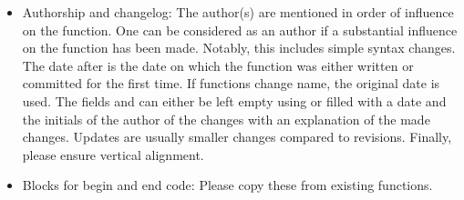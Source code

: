 \begin{itemize}
	\item Authorship and changelog:
	The author(s)  are mentioned in order of influence on the function.
	One can be considered as an author if a substantial influence on the function has been made.
	Notably, this includes simple syntax changes.
	The date after  is the date on which the function was either written or committed for the first time.
	If functions change name, the original date is used.
	The fields  and  can either be left empty using \mcomment{---} or filled with a date and the initials of the author of the changes with an explanation of the made changes.
	Updates are usually smaller changes compared to revisions.	
	Finally, please ensure vertical alignment.
	\item Blocks for begin and end code:
	Please copy these from existing functions.
\end{itemize}